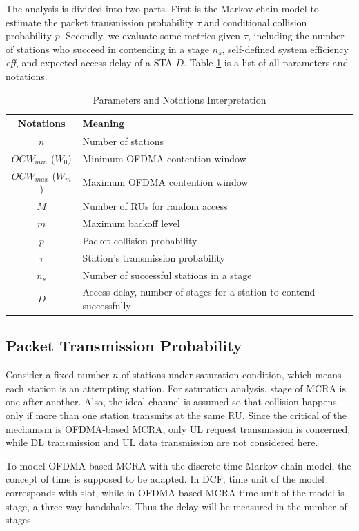 \documentclass[journal]{IEEEtran}
\begin{document}
The analysis is divided into two parts. First is the Markov chain model to estimate the packet transmission probability $\tau$ and conditional collision probability $p$. 
Secondly, we evaluate some metrics given $\tau$, including the number of stations who succeed in contending in a stage $n_s$, self-defined system efficiency \textit{eff}, and expected access delay of a STA $D$.  
Table \ref{table_notation} is a list of all parameters and notations.


\begin{table}[!h]
\caption{Parameters and Notations Interpretation}
\centering
\label{table_notation}
\begin{tabular}{c|m{4.5cm}}
\hline
Notations				& Meaning \\
\hline
$n$						& Number of stations \\
$OCW_{min}$ ($W_0$)		& Minimum OFDMA contention window \\
$OCW_{max}$ ($W_m$)		& Maximum OFDMA contention window \\
$M$						& Number of RUs for random access \\
$m$						& Maximum backoff level \\
$p$						& Packet collision probability \\
$\tau$					& Station's transmission probability \\
$n_s$					& Number of successful stations in a stage \\
$D$						& Access delay, number of stages for a station to contend successfully \\
\hline
\end{tabular}
\end{table}

\subsection{Packet Transmission Probability}
Consider a fixed number $n$ of stations under saturation condition, which means each station is an attempting station. 
For saturation analysis, stage of MCRA is one after another.
Also, the ideal channel is assumed so that collision happens only if more than one station transmits at the same RU.
Since the critical of the mechanism is OFDMA-based MCRA, only UL request transmission is concerned, while DL transmission and UL data transmission are not considered here. 

To model OFDMA-based MCRA with the discrete-time Markov chain model, the concept of time is supposed to be adapted. 
In DCF, time unit of the model corresponds with slot, while in OFDMA-based MCRA time unit of the model is stage, a three-way handshake. 
Thus the delay will be measured in the number of stages.
\end{document}
